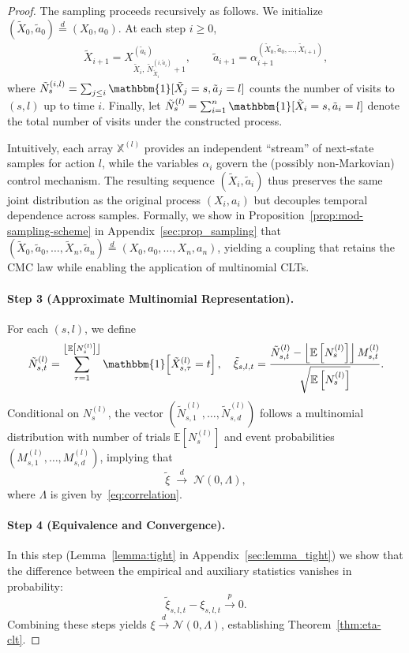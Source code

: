 \documentclass[twoside,11pt]{article}
\newcommand{\pow}[1]{^{(#1)}}%
\numberwithin{equation}{section}
\newcommand{\lp}{\left(}
\newcommand{\rp}{\right)}
\newcommand{\Xbb}{\mathbb{X}}
\newcommand{\Ncal}{\mathcal{N}}
\newcommand{\indicator}{\mathbbm{1}}
\begin{document}
\begin{proof}
The sampling proceeds recursively as follows. We initialize $(\tilde X_0,\tilde a_0)\overset{d}{=}(X_0,a_0)$.  
At each step $i\ge0$,
\begin{align*}
\tilde X_{i+1} = X^{(\tilde a_i)}_{\tilde X_i,\, \tilde N_{\tilde X_i}^{(i,\tilde a_i)}+1}, \qquad \tilde a_{i+1} = \alpha_{i+1}^{(\tilde X_0,\tilde a_0,\dots,\tilde X_{i+1})},
\end{align*}
where $\tilde N_{s}^{(i,l)}=\sum_{j\le i}\indicator[\tilde X_j=s,\tilde a_j=l]$ counts the number of visits to $(s,l)$ up to time $i$.  
Finally, let $\tilde N_s^{(l)}=\sum_{i=1}^n \indicator[\tilde X_i=s,\tilde a_i=l]$ denote the total number of visits under the constructed process.

Intuitively, each array $\Xbb^{(l)}$ provides an independent “stream” of next-state samples for action $l$, while the variables $\alpha_i$ govern the (possibly non-Markovian) control mechanism.  
The resulting sequence $(\tilde X_i,\tilde a_i)$ thus preserves the same joint distribution as the original process $(X_i,a_i)$ but decouples temporal dependence across samples.  
Formally, we show in Proposition~\ref{prop:mod-sampling-scheme} in Appendix~\ref{sec:prop_sampling} that $(\tilde X_0,\tilde a_0,\dots,\tilde X_n,\tilde a_n)\overset{d}{=}(X_0,a_0,\dots,X_n,a_n)$, yielding a coupling that retains the CMC law while enabling the application of multinomial CLTs.


\paragraph{Step 3 (Approximate Multinomial Representation).}
For each $(s,l)$, we define
\[
\tilde N_{s,t}\pow l = 
\sum_{\tau=1}^{\left\lfloor\mathbb E \left[N_s\pow l \right]\right\rfloor}
\indicator \!\left[\tilde X^{(l)}_{s,\tau}=t\right],
\quad
\tilde\xi_{s,l,t} =
\frac{\tilde N_{s,t}\pow l - \left\lfloor\mathbb E\left[N_s\pow l\right]\right\rfloor M_{s,t}\pow l}{\sqrt{\mathbb E\left[N_s\pow l\right]}}.
\]
Conditional on $N_s\pow l$, the vector
$\lp \tilde N_{s,1}\pow l,\dots,\tilde N_{s,d}\pow l\rp$
follows a multinomial distribution with number of trials $\mathbb E\left[N_s\pow l\right]$ and event probabilities $\lp M_{s,1}\pow l,\dots,M_{s,d}\pow l \rp$, implying that
\[
\tilde\xi \;\xrightarrow{d}\; \Ncal(0,\Lambda),
\]
where $\Lambda$ is given by~\cref{eq:correlation}.

\paragraph{Step 4 (Equivalence and Convergence).}
In this step (Lemma~\ref{lemma:tight} in Appendix~\ref{sec:lemma_tight}) we show that the difference between the empirical and auxiliary statistics vanishes in probability:
\[
\tilde\xi_{s,l,t}-\xi_{s,l,t}\xrightarrow{p}0.
\]
Combining these steps yields
$\xi \xrightarrow{d} \Ncal(0,\Lambda)$,
establishing Theorem~\ref{thm:eta-clt}.
\end{proof}
\end{document}
